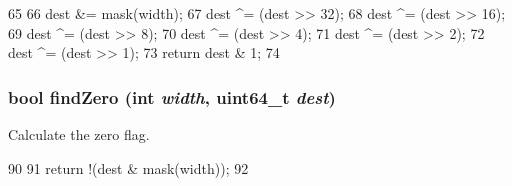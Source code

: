 \begin{DoxyCode}
65                                      {
66     dest &= mask(width);
67     dest ^= (dest >> 32);
68     dest ^= (dest >> 16);
69     dest ^= (dest >> 8);
70     dest ^= (dest >> 4);
71     dest ^= (dest >> 2);
72     dest ^= (dest >> 1);
73     return dest & 1;
74 }
\end{DoxyCode}
\hypertarget{condcodes_8hh_ac6d1aef2bae3d34668b695f62ed7bace}{
\subsubsection[{findZero}]{\setlength{\rightskip}{0pt plus 5cm}bool findZero (int {\em width}, \/  uint64\_\-t {\em dest})}}
\label{condcodes_8hh_ac6d1aef2bae3d34668b695f62ed7bace}
Calculate the zero flag. 


\begin{DoxyCode}
90                                    {
91     return !(dest & mask(width));
92 }
\end{DoxyCode}
